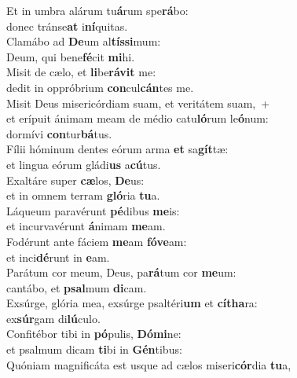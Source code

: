 \evenverse Et in umbra alárum tu\textbf{á}rum spe\textbf{rá}bo:~\*\\
\evenverse donec tránse\textbf{at} i\textbf{ní}quitas.\\
\oddverse Clamábo ad \textbf{De}um al\textbf{tís}\textbf{si}mum:~\*\\
\oddverse Deum, qui bene\textbf{fé}cit \textbf{mi}hi.\\
\evenverse Misit de cælo, et \textbf{li}be\textbf{rá}\textbf{vit} me:~\*\\
\evenverse dedit in oppróbrium \textbf{con}cul\textbf{cán}tes me.\\
\oddverse Misit Deus misericórdiam suam, et veritátem suam,~+\\
\oddverse  et erípuit ánimam meam de médio catu\textbf{ló}rum le\textbf{ó}num:~\*\\
\oddverse dormívi \textbf{con}tur\textbf{bá}tus.\\
\evenverse Fílii hóminum dentes eórum arma \textbf{et} sa\textbf{gít}tæ:~\*\\
\evenverse et lingua eórum gládi\textbf{us} a\textbf{cú}tus.\\
\oddverse Exaltáre super \textbf{cæ}los, \textbf{De}us:~\*\\
\oddverse et in omnem terram \textbf{gló}ria \textbf{tu}a.\\
\evenverse Láqueum paravérunt \textbf{pé}dibus \textbf{me}is:~\*\\
\evenverse et incurvavérunt \textbf{á}nimam \textbf{me}am.\\
\oddverse Fodérunt ante fáciem \textbf{me}am \textbf{fó}\textbf{ve}am:~\*\\
\oddverse et inci\textbf{dé}runt in \textbf{e}am.\\
\evenverse Parátum cor meum, Deus, pa\textbf{rá}tum cor \textbf{me}um:~\*\\
\evenverse cantábo, et \textbf{psal}mum \textbf{di}cam.\\
\oddverse Exsúrge, glória mea, exsúrge psaltéri\textbf{um} et \textbf{cí}\textbf{tha}ra:~\*\\
\oddverse ex\textbf{súr}gam di\textbf{lú}culo.\\
\evenverse Confitébor tibi in \textbf{pó}pulis, \textbf{Dó}\textbf{mi}ne:~\*\\
\evenverse et psalmum dicam \textbf{ti}bi in \textbf{Gén}tibus:\\
\oddverse Quóniam magnificáta est usque ad cælos miseri\textbf{cór}dia \textbf{tu}a,~\*\\
